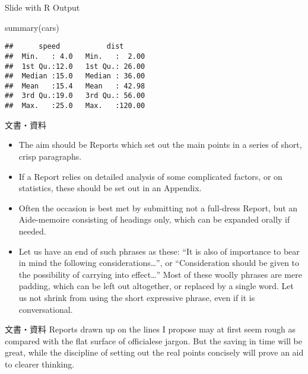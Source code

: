 \documentclass[
  ignorenonframetext,
]{beamer}
\newenvironment{Shaded}{\begin{snugshade}}{\end{snugshade}}
\newcommand{\FunctionTok}[1]{\textcolor[rgb]{0.00,0.00,0.00}{#1}}
\newcommand{\NormalTok}[1]{#1}
\providecommand{\tightlist}{%
  \setlength{\itemsep}{0pt}\setlength{\parskip}{0pt}}
\let\oldShaded\Shaded
\let\endoldShaded\endShaded
\renewenvironment{Shaded}{\footnotesize\oldShaded}{\endoldShaded}
\begin{document}
\begin{frame}[fragile]{Slide with R Output}
\protect\hypertarget{slide-with-r-output}{}
\begin{Shaded}
\begin{Highlighting}[]
\FunctionTok{summary}\NormalTok{(cars)}
\end{Highlighting}
\end{Shaded}

\begin{verbatim}
##      speed           dist       
##  Min.   : 4.0   Min.   :  2.00  
##  1st Qu.:12.0   1st Qu.: 26.00  
##  Median :15.0   Median : 36.00  
##  Mean   :15.4   Mean   : 42.98  
##  3rd Qu.:19.0   3rd Qu.: 56.00  
##  Max.   :25.0   Max.   :120.00
\end{verbatim}
\end{frame}

\begin{frame}{文書・資料}
\protect\hypertarget{ux6587ux66f8ux8cc7ux6599}{}
\begin{itemize}[<+->]
\tightlist
\item
  \textbullet{}\hspace{2pt} The aim should be Reports which set out the
  main points in a series of short, crisp paragraphs.
\item
  \textbullet{}\hspace{2pt} If a Report relies on detailed analysis of
  some complicated factors, or on statistics, these should be set out in
  an Appendix.
\item
  \textbullet{}\hspace{2pt} Often the occasion is best met by submitting
  not a full-dress Report, but an Aide-memoire consisting of headings
  only, which can be expanded orally if needed.
\item
  \textbullet\hspace{2pt}Let us have an end of such phrases as these:
  ``It is also of importance to bear in mind the following
  considerations\ldots{}'', or ``Consideration should be given to the
  possibility of carrying into effect\ldots{}'' Most of these woolly
  phrases are mere padding, which can be left out altogether, or
  replaced by a single word. Let us not shrink from using the short
  expressive phrase, even if it is conversational.
\end{itemize}
\end{frame}

\begin{frame}{文書・資料}
\protect\hypertarget{ux6587ux66f8ux8cc7ux6599-1}{}
Reports drawn up on the lines I propose may at first seem rough as
compared with the flat surface of officialese jargon. But the saving in
time will be great, while the discipline of setting out the real points
concisely will prove an aid to clearer thinking.
\end{frame}
\end{document}
